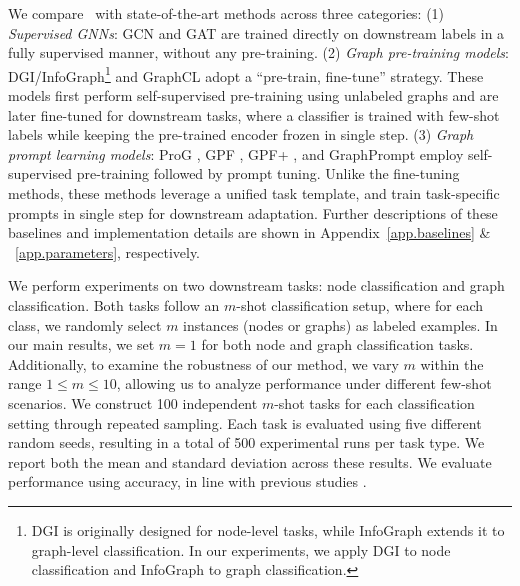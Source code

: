 We compare \model\ with state-of-the-art methods across three categories:
(1) \emph{Supervised GNNs}: GCN \cite{kipf2016semi} and GAT \cite{velivckovic2017graph} are trained directly on downstream labels in a fully supervised manner, without any pre-training.
(2) \emph{Graph pre-training models}: DGI/InfoGraph\footnote{DGI is originally designed for node-level tasks, while InfoGraph extends it to graph-level classification. In our experiments, we apply DGI to node classification and InfoGraph to graph classification.} \cite{velivckovic2017graph,sun2019infograph} and GraphCL \cite{you2020graph} adopt a “pre-train, fine-tune” strategy. These models first perform self-supervised pre-training using unlabeled graphs and are later fine-tuned for downstream tasks, where a classifier is trained with few-shot labels while keeping the pre-trained encoder frozen in single step.
(3) \emph{Graph prompt learning models}: ProG \cite{sun2023all}, GPF \cite{fang2024universal}, GPF+ \cite{fang2024universal}, and GraphPrompt \cite{liu2023graphprompt} employ self-supervised pre-training followed by prompt tuning. Unlike the fine-tuning methods, these methods leverage a unified task template, and train task-specific prompts in single step for downstream adaptation.
Further descriptions of these baselines and implementation details are shown in Appendix~\ref{app.baselines} \& ~\ref{app.parameters}, respectively.


We perform experiments on two downstream tasks: node classification and graph classification. Both tasks follow an \( m \)-shot classification setup, where for each class, we randomly select \( m \) instances (nodes or graphs) as labeled examples.
In our main results, we set \( m = 1 \) for both node and graph classification tasks. Additionally, to examine the robustness of our method, we vary \( m \) within the range \( 1 \leq m \leq 10 \), allowing us to analyze performance under different few-shot scenarios.
We construct 100 independent \( m \)-shot tasks for each classification setting through repeated sampling. Each task is evaluated using five different random seeds, resulting in a total of 500 experimental runs per task type. We report both the mean and standard deviation across these results.
We evaluate performance using accuracy, in line with previous studies \cite{wang2020graph,liu2021relative,liu2023graphprompt}.

